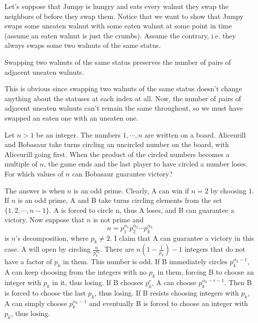 \documentclass[11pt]{scrartcl}
\begin{document}
\begin{soln}
  Let's suppose that Jumpy is hungry and eats every walnut they swap the neighbors of before they swap them. Notice that we want to show that
  Jumpy swaps some uneaten walnut with some eaten walnut at some point in time (assume an eaten walnut is just the crumbs).
  Assume the contrary, i.e. they always swaps some two walnuts of the same status.
  \begin{lemma}
    Swapping two walnuts of the same status preserves the number of pairs of adjacent uneaten walnuts.
  \end{lemma}
  This is obvious since swapping two walnuts of the same status doesn't change anything about the statuses at each index at all.
  \newline \newline
  Now, the number of pairs of adjacent uneaten walnuts can't remain the same throughout, so we must have swapped an eaten one with an uneaten one.
\end{soln}
\begin{example}
  [ELMO 2022/1]
  Let $n>1$ be an integer. The numbers $1,\cdots, n$ are written on a board. Aliceurill
  and Bobasaur take turns circling an uncircled number on the board, with Aliceurill
  going first. When the product of the circled numbers becomes a multiple of $n$, the
  game ends and the last player to have circled a number loses. For which values of
  $n$ can Bobasaur guarantee victory?
\end{example}
\begin{soln}
  The answer is when $n$ is an odd prime. Clearly, A can win if $n=2$ by choosing $1$.
  If $n$ is an odd prime, A and B take turns circling elements from the set
  $\{1,2,\cdots, n-1\}$. A is forced to circle n, thus A loses, and B can guarantee a
  victory. Now suppose that $n$ is not prime and
  $$n=p_1^{\alpha_1}p_2^{\alpha_2}\cdots p_k^{\alpha_k}$$
  is $n$'s decomposition, where $p_k\ne 2$. I claim that A can guarantee a victory in this case. A will open by circling
  $\frac{n}{p_k^{\alpha_k}}$. There are $n\left(1-\frac{1}{p_k}\right)-1$ integers
  that do not have a factor of $p_k$ in them. This number is odd. If B immediately
  circles $p_k^{\alpha_k-1}$, A can keep choosing from the integers with no $p_k$ in them,
  forcing B to choose an integer with $p_k$ in it, thus losing. If B chooses $p_k^r$,
  A can choose $p_k^{\alpha_k-r-1}$. Then B is forced to choose the last $p_k$, thus losing.
  If B resists choosing integers with $p_k$, A can simply choose $p_k^{\alpha_k-1}$ and
  eventually B is forced to choose an integer with $p_k$, thus losing.
\end{soln}
\end{document}
